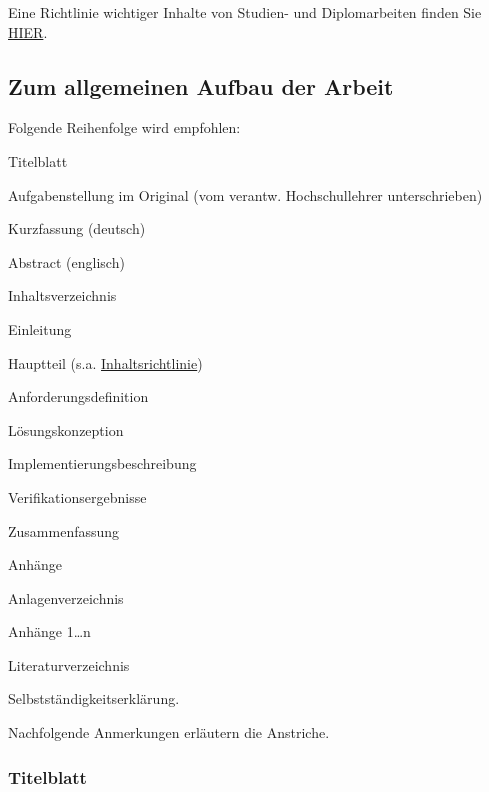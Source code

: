 Eine Richtlinie wichtiger Inhalte von Studien- und Diplomarbeiten finden Sie \href{http://www.et.tu-dresden.de/ifa/index.php?id=336&L=1?keepThis=true}{HIER}.

\subsection{Zum allgemeinen Aufbau der Arbeit}
\label{sec:ZumAllgemeinenAufbauDerArbeit}

Folgende Reihenfolge wird empfohlen:
\begin{compactitem}
  \item Titelblatt
  \item Aufgabenstellung im Original (vom verantw. Hochschullehrer unterschrieben)
  \item Kurzfassung (deutsch)
  \item Abstract (englisch)
    \item Inhaltsverzeichnis
    \item Einleitung
    \item Hauptteil (s.a. \href{http://www.et.tu-dresden.de/ifa/index.php?id=336&L=1?keepThis=true}{Inhaltsrichtlinie})
  \begin{compactitem}
    \item Anforderungsdefinition
      \item Lösungskonzeption
        \item Implementierungsbeschreibung
      \item Verifikationsergebnisse
  \end{compactitem}
    \item Zusammenfassung
    \item Anhänge
  \begin{compactitem}
      \item Anlagenverzeichnis
          \item Anhänge 1\dots n
  \end{compactitem}
  \item Literaturverzeichnis
  \item Selbstständigkeitserklärung.
\end{compactitem}

Nachfolgende Anmerkungen erläutern die Anstriche.


\subsubsection{Titelblatt}
\label{sec:Titelblatt}

